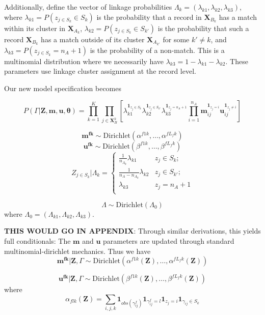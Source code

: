 \documentclass[
  12pt,
]{article}
\begin{document}
Additionally, define the vector of linkage probabilities
\(\Lambda_k = (\lambda_{k1}, \lambda_{k2}, \lambda_{k3})\), where
\(\lambda_{k1} = P(z_{j\in S_k} \in S_k)\) is the probability that a
record in \(\mathbf{X}_{B_k}\) has a match within its cluster in
\(\mathbf{X}_{A_k}\), \(\lambda_{k2} = P(z_{j \in S_k} \in S_{k'})\) is
the probability that such a record \(\mathbf{X}_{B_k}\) has a match
outside of its cluster \(\mathbf{X}_{A_{k'}}\) for some \(k' \neq k\),
and \(\lambda_{k3} = P(z_{j\in S_k} = n_A + 1)\) is the probability of a
non-match. This is a multinomial distribution where we necessarily have
\(\lambda_{k3} = 1 - \lambda_{k1} - \lambda_{k2}\). These parameters use
linkage cluster assignment at the record level.

Our new model specification becomes

\[P(\Gamma|\mathbf{Z}, \mathbf{m}, \mathbf{u}, \boldsymbol{\theta}) =\prod_{k=1}^K \prod_{j \in \mathbf{X}_B^k}  \left[\lambda_{k1}^{\mathbf{1}_{z_j \in S_k}}\lambda_{k2}^{\mathbf{1}_{z_j \in S_{k'}}} \lambda_{k3}^{\mathbf{1}_{z_j = n_A + 1}}\prod_{i=1}^{n_A}\mathbf{m}_{ij}^{\mathbf{1}_{z_j = i}}\mathbf{u}_{ij}^{\mathbf{1}_{z_j \neq i}}\right]\]

\[\mathbf{m^{fk}} \sim \text{Dirichlet}(\alpha^{f1k}, \ldots, \alpha^{fL_fk})\]
\[\mathbf{u^{fk}} \sim \text{Dirichlet}(\beta^{f1k}, \ldots, \beta^{fL_fk})\]
\[Z_{j \in S_k} | \Lambda_k =
\begin{cases} 
    \frac{1}{n_{A_k}}\lambda_{k1}  & z_j \in S_k; \\
    \frac{1}{n_A - n_{A_k}}\lambda_{k2}  & z_j \in S_{k'}; \\
     \lambda_{k3} & z_j = n_A + 1 \\
\end{cases}\]

\[\Lambda \sim \text{Dirichlet}(\Lambda_0)\] where
\(\Lambda_0 = (\Lambda_{k1}, \Lambda_{k2}, \Lambda_{k3}).\)

\textbf{THIS WOULD GO IN APPENDIX}: Through similar derivations, this
yields full conditionals: The \(\mathbf{m}\) and \(\mathbf{u}\)
parameters are updated through standard multinomial-dirichlet mechanics.
Thus we have
\[\mathbf{m^{fk}}|\mathbf{Z}, \Gamma \sim \text{Dirichlet}(\alpha^{f1k}(\mathbf{Z}), \ldots, \alpha^{fL_fk}(\mathbf{Z}))\]

\[\mathbf{u^{fk}}|\mathbf{Z}, \Gamma \sim \text{Dirichlet}(\beta^{f1k}(\mathbf{Z}), \ldots, \beta^{fL_fk}(\mathbf{Z}))\]
where
\[\alpha_{flk}(\mathbf{Z})= \sum_{i,j, k} \mathbf{1}_{obs(\gamma_{ij}^f)}\mathbf{1}_{\gamma_{ij}^f = l} \mathbf{1}_{z_j = i}\mathbf{1}_{\gamma_{ij} \in S_k}\]
\end{document}
